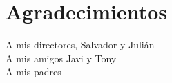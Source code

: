 \chapter*{Agradecimientos}
\thispagestyle{empty}

       \vspace{1cm}





\begin{flushright}
	A mis directores, Salvador y Julián \\
	\vspace{0.13cm}
	A mis amigos Javi y Tony\\
	\vspace{0.13cm}
	A mis padres
\end{flushright}
